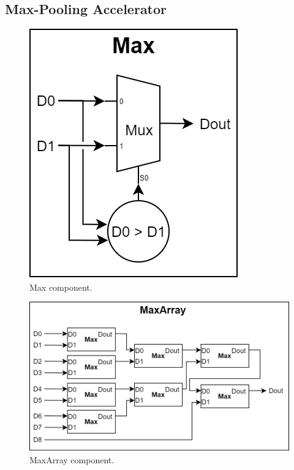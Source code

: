 \subsection{Max-Pooling Accelerator}


\begin{figure} [H]
	\centering
	\includegraphics[scale=0.4]{Images/Platform/Max_component.png}
	\decoRule
	\caption[Max component]{Max component.}
	\label{fig:max-component}
\end{figure}

\begin{figure} [H]
	\centering
	\includegraphics[width=\textwidth]{Images/Platform/MaxArray_component.png}
	\decoRule
	\caption[MaxArray component]{MaxArray component.}
	\label{fig:max-array-component}
\end{figure}

